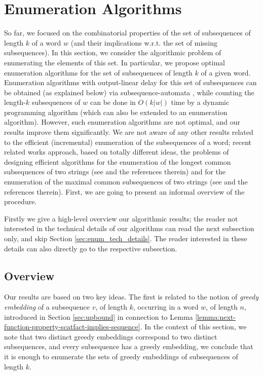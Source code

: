 \documentclass[runningheads,UKenglish,cleveref, autoref, thm-restate]{llncs}
\begin{document}
	\section{Enumeration Algorithms}\label{sec:enum}
So far, we focused on the combinatorial properties of the set of subsequences of length $k$ of a word $w$ (and their implications w.r.t. the set of missing subsequences). In this section, we consider the algorithmic problem of enumerating the elements of this set. 
In particular, we propose optimal  enumeration algorithms for the set of subsequences of length $k$ of a given word. 
Enumeration algorithms with output-linear delay for this set of subsequences can be obtained (as explained below) via subsequence-automata \cite{CrochemoreMT03}, while counting the length-$k$ subsequences of $w$ can be done in $O(k|w|)$ time by a dynamic programming algorithm \cite{ELZINGA2008394} (which can also be extended to an enumeration algorithm). However, such enumeration algorithms are not optimal, and our results improve them significantly. We are not aware of any other results related to the efficient (incremental) enumeration of the subsequences of a word; recent related works approach, based on totally different ideas, the problems of designing efficient algorithms for the enumeration of the longest common subsequences of two strings (see \cite{Sakai25,Sakai25-2} and the references therein) and for the enumeration of the maximal common subsequences of two strings (see \cite{ConteGPU22,BuzzegaEtAl} and the references therein). %
First, we are going to present an informal overview of the procedure.

Firstly we give a high-level overview our algorithmic results; the reader not interested in the technical details of our algorithms can read the next subsection only, and skip Section \ref{sec:enum_tech_details}. The reader interested in these details can also directly go to the respective subsection.


\subsection{Overview}

Our results are based on two key ideas. The first is related to the notion of {\em greedy embedding} of a subsequence $v$, of length $k$, occurring in a word $w$, of length $n$, introduced in Section \ref{sec:upbound} in connection to Lemma \ref{lemma:next-function-property-scatfact-implies-sequence}. 
In the context of this section, we note that two distinct greedy embeddings correspond to two distinct subsequences, and every subsequence has a greedy embedding, we conclude that it is enough to enumerate the sets of greedy embeddings of subsequences of length $k$. 
\end{document}
